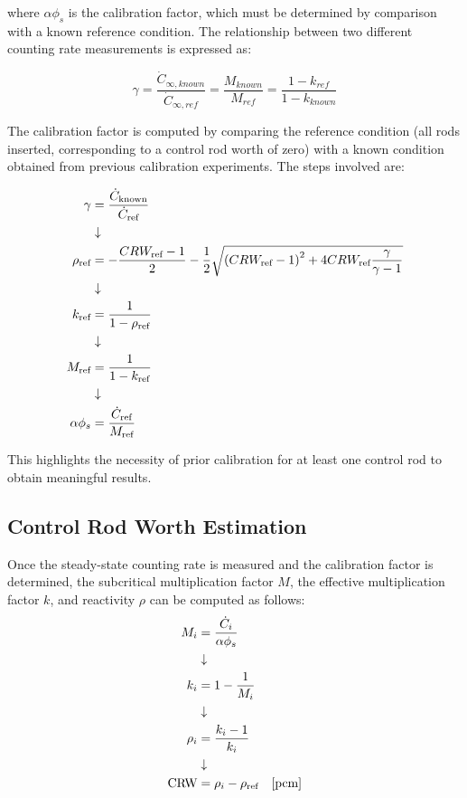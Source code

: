 where $ \alpha \phi_s $ is the calibration factor, which must be determined by comparison with a known reference condition. The relationship between two different counting rate measurements is expressed as:

\begin{equation}
\gamma = \frac{\dot{C}_{\infty,known}}{\dot{C}_{\infty,ref}} = \frac{M_{known}}{M_{ref}} = \frac{1-k_{ref}}{1-k_{known}}
\end{equation}

The calibration factor is computed by comparing the reference condition (all rods inserted, corresponding to a control rod worth of zero) with a known condition obtained from previous calibration experiments. The steps involved are:


\begin{align}
    \gamma &= \frac{\dot{C}_{\text{known}}}{\dot{C}_{\text{ref}}} \notag \\
    & \downarrow  \notag \\
    \rho_{\text{ref}} &= - \frac{CRW_{\text{ref}} - 1}{2} - \frac{1}{2} \sqrt{\left( CRW_{\text{ref}} - 1\right)^2 + 4 CRW_{\text{ref}} \frac{\gamma}{\gamma - 1}} \notag \\
    & \downarrow  \notag \\
    k_{\text{ref}} &= \frac{1}{1 - \rho_{\text{ref}}} \notag \\
    & \downarrow  \notag \\
    M_{\text{ref}} &= \frac{1}{1 - k_{\text{ref}}} \notag \\
    & \downarrow  \notag \\
    \alpha \phi_s &= \frac{\dot{C}_{\text{ref}}}{M_{\text{ref}}}
\end{align}

This highlights the necessity of prior calibration for at least one control rod to obtain meaningful results.

\subsection{Control Rod Worth Estimation}

Once the steady-state counting rate is measured and the calibration factor is determined, the subcritical multiplication factor $ M $, the effective multiplication factor $ k $, and reactivity $ \rho $ can be computed as follows:
\begin{align}
    M_i &= \frac{\dot{C}_i}{\alpha \phi_s} \notag \\
    & \downarrow \notag \\
    k_i &= 1 - \frac{1}{M_i} \notag \\
    & \downarrow \notag \\
    \rho_i &= \frac{k_i - 1}{k_i} \notag \\
    & \downarrow \notag \\
    \text{CRW} &=  \rho_i -\rho_{\text{ref}} \quad [\text{pcm}]
\end{align}


